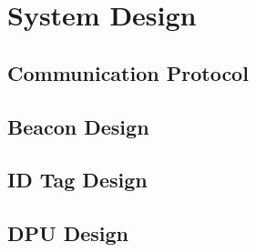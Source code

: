 

\setcounter{section}{2}
\section{System Design}
\bigskip

\subsection{Communication Protocol}

\subsection{Beacon Design}

\subsection{ID Tag Design}

\subsection{DPU Design}